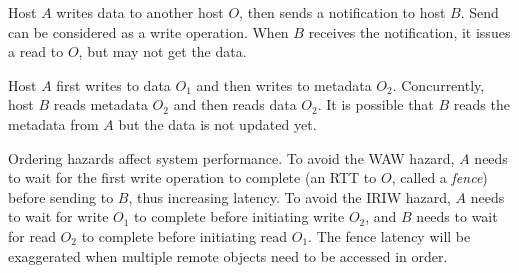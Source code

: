 Host $A$ writes data to another host $O$, then sends a notification to host $B$. Send can be considered as a write operation.
When $B$ receives the notification, it issues a read to $O$, but may not get the data.

Host $A$ first writes to data $O_1$ and then writes to metadata $O_2$. Concurrently, host $B$ reads metadata $O_2$ and then reads data $O_2$.
It is possible that $B$ reads the metadata from $A$ but the data is not updated yet.



Ordering hazards affect system performance. To avoid the WAW hazard, $A$ needs to wait for the first write operation to complete (an RTT to $O$, called a \emph{fence}) before sending to $B$, thus increasing latency. To avoid the IRIW hazard, $A$ needs to wait for write $O_1$ to complete before initiating write $O_2$, and $B$ needs to wait for read $O_2$ to complete before initiating read $O_1$. The fence latency will be exaggerated when multiple remote objects need to be accessed in order.


